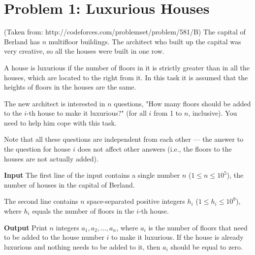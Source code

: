 \normalfont\documentclass[letterpaper,11pt]{article}
\begin{document}
\newcommand{\header}{
	\noindent \fbox{
	\begin{minipage}{6.4in}
  	\medskip
  	\textbf{ACM algorithm practice} \hfill \textbf{Fall 2015} \\[1mm]
  	\begin{center}
    	{\Large Week 1 Problems} \\[3mm]
  	\end{center}
	\today \hfill \itshape{Timothy Johnson}
	\medskip
	\end{minipage}}
}

\bigskip

\section*{Problem 1: Luxurious Houses}
(Taken from: http://codeforces.com/problemset/problem/581/B) \newline
The capital of Berland has $n$ multifloor buildings. The architect who built up the capital was very creative, so all the houses were built in one row.

A house is luxurious if the number of floors in it is strictly greater than in all the houses, which are located to the right from it. In this task it is assumed that the heights of floors in the houses are the same.

The new architect is interested in $n$ questions, "How many floors should be added to the $i$-th house to make it luxurious?" (for all $i$ from 1 to $n$, inclusive). You need to help him cope with this task.

Note that all these questions are independent from each other — the answer to the question for house $i$ does not affect other answers (i.e., the floors to the houses are not actually added).

\textbf{Input} \newline
The first line of the input contains a single number $n$ ($1 \leq  n  \leq 10^5$), the number of houses in the capital of Berland.

The second line contains $n$ space-separated positive integers $h_i$ ($1 \leq h_i \leq 10^9$), where $h_i$ equals the number of floors in the $i$-th house.

\textbf{Output} \newline
Print $n$ integers $a_1, a_2, \ldots, a_n$, where $a_i$ is the number of floors that need to be added to the house number $i$ to make it luxurious. If the house is already luxurious and nothing needs to be added to it, then $a_i$ should be equal to zero.
\end{document}
